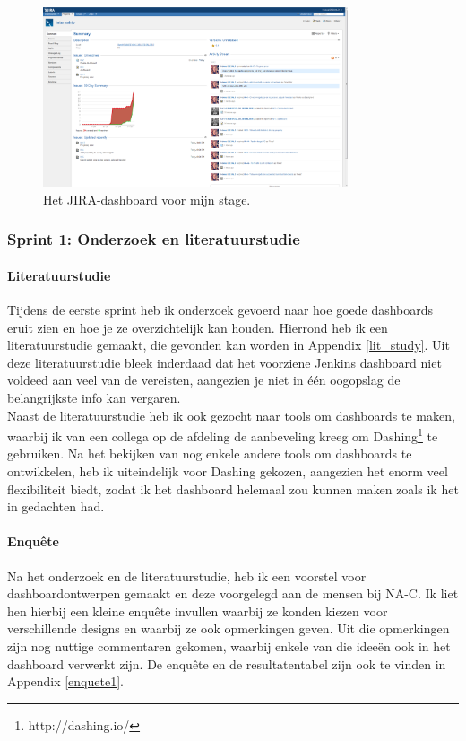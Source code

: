 \documentclass[10pt,a4paper]{article}
\begin{document}
\begin{figure}[ht!]
\centering
\includegraphics[width=90mm]{myJIRAscreenshot.png}
\caption{Het JIRA-dashboard voor mijn stage.} 
\label{my_jira}
\end{figure}

\subsubsection{Sprint 1: Onderzoek en literatuurstudie} 
\label{sprint1}
\paragraph{Literatuurstudie} Tijdens de eerste sprint heb ik onderzoek gevoerd naar hoe goede dashboards eruit zien en hoe je ze overzichtelijk kan houden. Hierrond heb ik een literatuurstudie gemaakt, die gevonden kan worden in Appendix \ref{lit_study}. Uit deze literatuurstudie bleek inderdaad dat het voorziene Jenkins dashboard niet voldeed aan veel van de vereisten, aangezien je niet in \'e\'en oogopslag de belangrijkste info kan vergaren.\\
Naast de literatuurstudie heb ik ook gezocht naar tools om dashboards te maken, waarbij ik van een collega op de afdeling de aanbeveling kreeg om Dashing\footnote{http://dashing.io/} te gebruiken. Na het bekijken van nog enkele andere tools om dashboards te ontwikkelen, heb ik uiteindelijk voor Dashing gekozen, aangezien het enorm veel flexibiliteit biedt, zodat ik het dashboard helemaal zou kunnen maken zoals ik het in gedachten had. 
\paragraph{Enqu\^ete}
Na het onderzoek en de literatuurstudie, heb ik een voorstel voor dashboardontwerpen gemaakt en deze voorgelegd aan de mensen bij NA-C. Ik liet hen hierbij een kleine enqu\^ete invullen waarbij ze konden kiezen voor verschillende designs en waarbij ze ook opmerkingen geven. Uit die opmerkingen zijn nog nuttige commentaren gekomen, waarbij enkele van die idee\"en ook in het dashboard verwerkt zijn. De enqu\^ete en de resultatentabel zijn ook te vinden in Appendix \ref{enquete1}. 
\end{document}
